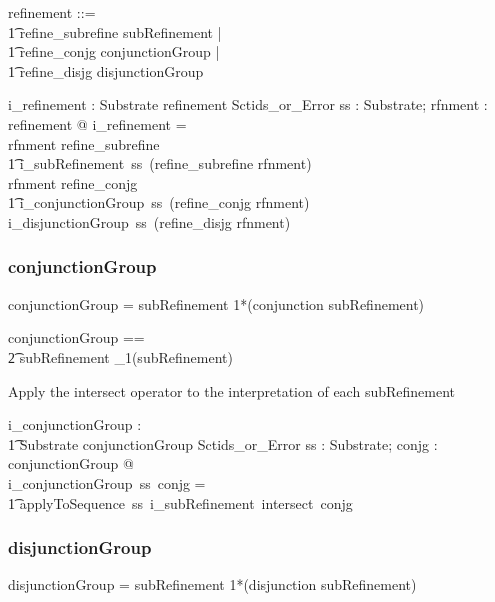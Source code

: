 \documentclass{article}
\def\bnf#1{{\scriptsize {{#1}} }}
\begin{document}
\begin{zed}
refinement ::= \\
\t1 refine\_subrefine \ldata subRefinement \rdata | \\
\t1 refine\_conjg \ldata conjunctionGroup \rdata | \\
\t1 refine\_disjg \ldata disjunctionGroup \rdata
\end{zed}

\begin{gendef}
   i\_refinement : Substrate \fun refinement \fun Sctids\_or\_Error
\where
   \forall ss : Substrate; rfnment : refinement @ i\_refinement = \\
   \IF rfnment \in \ran refine\_subrefine \\
\t1 \THEN i\_subRefinement~ss~(refine\_subrefine \inv rfnment) \\
   \ELSE \IF rfnment \in \ran refine\_conjg \\
\t1 \THEN i\_conjunctionGroup~ss~(refine\_conjg \inv rfnment) \\
   \ELSE i\_disjunctionGroup~ss~(refine\_disjg \inv rfnment)
\end{gendef}

\subsubsection{conjunctionGroup}
\begin{framed}
\noindent
\bnf{conjunctionGroup = subRefinement 1*(conjunction subRefinement)}
\end{framed}

\begin{zed}
conjunctionGroup == \\
\t2 subRefinement \cross \seq_1(subRefinement)
\end{zed}

Apply the intersect operator to the interpretation of each  subRefinement

\begin{gendef}
    i\_conjunctionGroup : \\
\t1 Substrate \fun conjunctionGroup \fun Sctids\_or\_Error
\where
   \forall ss : Substrate;  conjg : conjunctionGroup @ \\
i\_conjunctionGroup~ss~conjg = \\
\t1 applyToSequence~ss~i\_subRefinement~intersect~conjg
\end{gendef}


\subsubsection{disjunctionGroup}
\begin{framed}
\noindent
\bnf{disjunctionGroup = subRefinement 1*(disjunction subRefinement)}
\end{framed}
\end{document}
